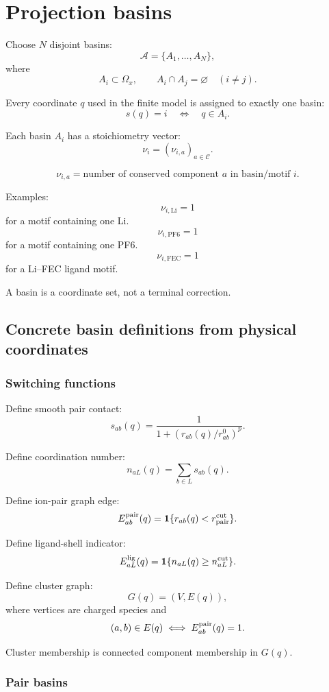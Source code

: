\documentclass[11pt]{article}
\begin{document}
\section{Projection basins}
\label{sec:basins}

Choose \(N\) disjoint basins:
\[
\mathcal A=\{A_1,\ldots,A_N\},
\]
where
\[
A_i\subset\Omega_x,
\qquad
A_i\cap A_j=\varnothing \quad(i\ne j).
\]

Every coordinate \(q\) used in the finite model is assigned to exactly one
basin:
\[
s(q)=i
\quad
\Longleftrightarrow
\quad
q\in A_i.
\]

Each basin \(A_i\) has a stoichiometry vector:
\[
\nu_i=(\nu_{i,a})_{a\in\mathcal C}.
\]

\[
\nu_{i,a}
=
\text{number of conserved component }a\text{ in basin/motif }i.
\]

Examples:
\[
\nu_{i,\mathrm{Li}}=1
\]
for a motif containing one Li.
\[
\nu_{i,\mathrm{PF6}}=1
\]
for a motif containing one PF6.
\[
\nu_{i,\mathrm{FEC}}=1
\]
for a Li--FEC ligand motif.

A basin is a coordinate set, not a terminal correction.

\subsection{Concrete basin definitions from physical coordinates}

\subsubsection{Switching functions}

Define smooth pair contact:
\[
s_{ab}(q)
=
\frac{1}{1+(r_{ab}(q)/r_{ab}^0)^p}.
\]

Define coordination number:
\[
n_{aL}(q)=\sum_{b\in L}s_{ab}(q).
\]

Define ion-pair graph edge:
\[
E_{a b}^{\rm pair}(q)
=
\mathbf 1\{r_{ab}(q)<r_{\rm pair}^{\rm cut}\}.
\]

Define ligand-shell indicator:
\[
E_{aL}^{\rm lig}(q)
=
\mathbf 1\{n_{aL}(q)\ge n_{aL}^{\rm cut}\}.
\]

Define cluster graph:
\[
G(q)=(V,E(q)),
\]
where vertices are charged species and
\[
(a,b)\in E(q)
\iff
E_{ab}^{\rm pair}(q)=1.
\]

Cluster membership is connected component membership in \(G(q)\).

\subsubsection{Pair basins}
\end{document}
